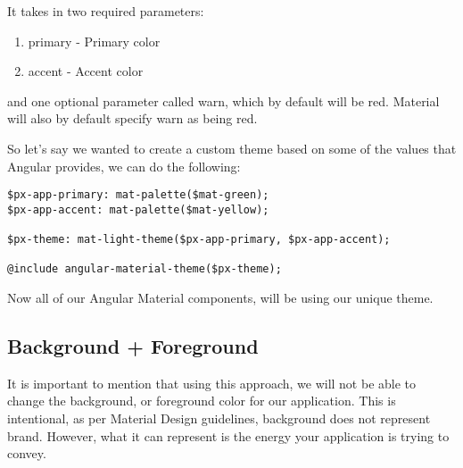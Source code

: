 It takes in two required parameters: 
\begin{enumerate}
  \item primary - Primary color
  \item accent - Accent color 
\end{enumerate}
and one optional parameter called warn, which by default will be red. Material 
will also by default specify warn as being red. 

So let's say we wanted to create a custom theme based on some of the values 
that Angular provides, we can do the following: 

\begin{lstlisting}
$px-app-primary: mat-palette($mat-green);
$px-app-accent: mat-palette($mat-yellow);

$px-theme: mat-light-theme($px-app-primary, $px-app-accent);

@include angular-material-theme($px-theme);
\end{lstlisting}

Now all of our Angular Material components, will be using our unique theme.

\subsection{Background + Foreground}
It is important to mention that using this approach, we will not be able to
change the background, or foreground color for our application. This is
intentional, as per Material Design guidelines, background does not represent 
brand. However, what it can represent is the energy your application is trying
to convey. 

